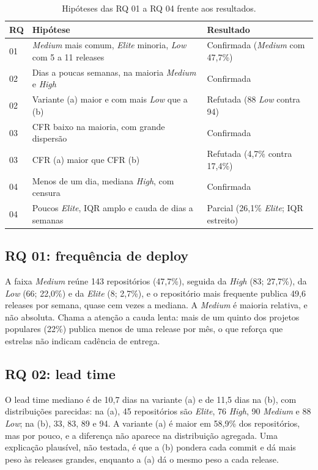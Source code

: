 \begin{table}[t]
\centering
\footnotesize
\caption{Hipóteses das RQ 01 a RQ 04 frente aos resultados.}
\label{tab:hipoteses}
\begin{tabular}{p{}p{}p{}}
\hline
RQ & Hipótese & Resultado \\
\hline
01 & \textit{Medium} mais comum, \textit{Elite} minoria, \textit{Low} com 5 a 11 releases & Confirmada (\textit{Medium} com 47,7\%) \\
02 & Dias a poucas semanas, na maioria \textit{Medium} e \textit{High} & Confirmada \\
02 & Variante (a) maior e com mais \textit{Low} que a (b) & Refutada (88 \textit{Low} contra 94) \\
03 & CFR baixo na maioria, com grande dispersão & Confirmada \\
03 & CFR (a) maior que CFR (b) & Refutada (4,7\% contra 17,4\%) \\
04 & Menos de um dia, mediana \textit{High}, com censura & Confirmada \\
04 & Poucos \textit{Elite}, IQR amplo e cauda de dias a semanas & Parcial (26,1\% \textit{Elite}; IQR estreito) \\
\hline
\end{tabular}
\end{table}

\subsection{RQ 01: frequência de deploy}

A faixa \textit{Medium} reúne 143 repositórios (47,7\%), seguida da \textit{High} (83; 27,7\%), da \textit{Low} (66; 22,0\%) e da \textit{Elite} (8; 2,7\%), e o repositório mais frequente publica 49,6 releases por semana, quase cem vezes a mediana. A \textit{Medium} é maioria relativa, e não absoluta. Chama a atenção a cauda lenta: mais de um quinto dos projetos populares (22\%) publica menos de uma release por mês, o que reforça que estrelas não indicam cadência de entrega.

\subsection{RQ 02: lead time}

O lead time mediano é de 10,7 dias na variante (a) e de 11,5 dias na (b), com distribuições parecidas: na (a), 45 repositórios são \textit{Elite}, 76 \textit{High}, 90 \textit{Medium} e 88 \textit{Low}; na (b), 33, 83, 89 e 94. A variante (a) é maior em 58,9\% dos repositórios, mas por pouco, e a diferença não aparece na distribuição agregada. Uma explicação plausível, não testada, é que a (b) pondera cada commit e dá mais peso às releases grandes, enquanto a (a) dá o mesmo peso a cada release.

